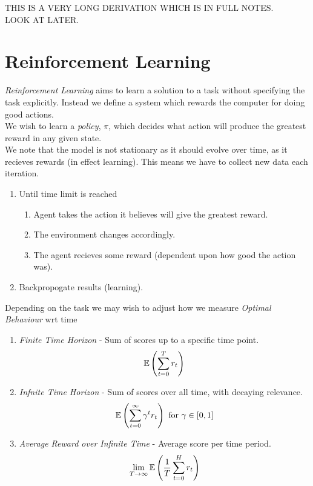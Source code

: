 \documentclass[11pt,a4paper]{article}
\begin{document}
THIS IS A VERY LONG DERIVATION WHICH IS IN FULL NOTES.\\
LOOK AT LATER.

\section{Reinforcement Learning}

\textit{Reinforcement Learning} aims to learn a solution to a task without specifying the task explicitly. Instead we define a system which rewards the computer for doing good actions.\\
We wish to learn a \textit{policy}, $\pi$, which decides what action will produce the greatest reward in any given state.\\
We note that the model is not stationary as it should evolve over time, as it recieves rewards (in effect learning). This means we have to collect new data each iteration.\\

\begin{enumerate}[label=\arabic*)]
	\item Until time limit is reached
	\begin{enumerate}[label=\roman*)]
		\item Agent takes the action it believes will give the greatest reward.
		\item The environment changes accordingly.
		\item The agent recieves some reward (dependent upon how good the action was).
	\end{enumerate}
	\item Backpropogate results (learning).
\end{enumerate}

Depending on the task we may wish to adjust how we measure \textit{Optimal Behaviour} wrt time
\begin{enumerate}
	\item \textit{Finite Time Horizon} - Sum of scores up to a specific time point.
	$$\mathbb{E}\left(\sum_{t=0}^Tr_t\right)$$
	\item \textit{Infnite Time Horizon} - Sum of scores over all time, with decaying relevance.
	$$\mathbb{E}\left(\sum_{t=0}^\infty\gamma^tr_t\right)\text{ for }\gamma\in[0,1]$$
	\item \textit{Average Reward over Infinite Time} - Average score per time period.
	$$\lim_{T\to\infty}\mathbb{E}\left(\frac1T\sum_{t=0}^Hr_t\right)$$
\end{enumerate}
\end{document}

